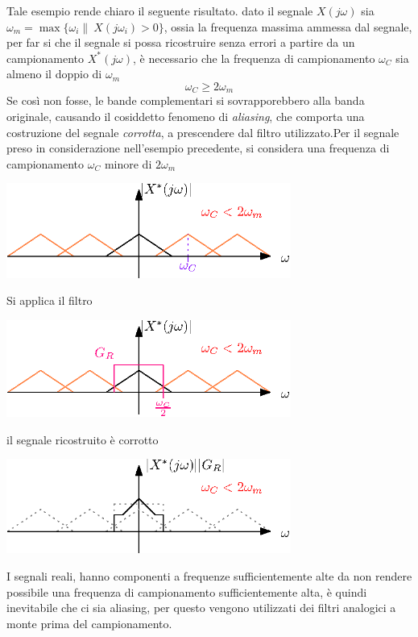 \documentclass[10pt, letterpaper]{report}
\begin{document}
Tale esempio rende chiaro il seguente risultato.\acc 
{} dato il segnale $X(j\omega)$ sia $\omega_m=\max\{\omega_i\| \ X(j\omega_i)>0\}$, ossia la frequenza massima ammessa dal segnale, per far si che il segnale si possa ricostruire senza errori a partire da un campionamento $X^*(j\omega)$, è necessario che la frequenza di campionamento $\omega_C$ sia almeno il doppio di $\omega_m$ $$\omega_C\ge 2\omega_m $$
Se così non fosse, le bande complementari si sovrapporebbero alla banda originale, causando il cosiddetto fenomeno di \textit{aliasing}, che comporta una costruzione del segnale \textit{corrotta}, a prescendere dal filtro utilizzato.\acc Per il segnale preso in considerazione nell'esempio precedente, si considera una frequenza di campionamento $\omega_C$ minore di $2\omega_m$
\begin{center}
    \includegraphics[width=0.7\textwidth]{images/segLimitatoBanda4.eps}
\end{center}
Si applica il filtro 
\begin{center}
    \includegraphics[width=0.7\textwidth]{images/segLimitatoBanda5.eps}
\end{center}
il segnale ricostruito è corrotto
\begin{center}
    \includegraphics[width=0.7\textwidth]{images/segLimitatoBanda6.eps}
\end{center}
I segnali reali, hanno componenti a frequenze sufficientemente alte da non rendere possibile una frequenza di campionamento sufficientemente alta, è quindi inevitabile che ci sia aliasing, per questo vengono utilizzati dei filtri analogici a monte prima del campionamento. 
\end{document}
